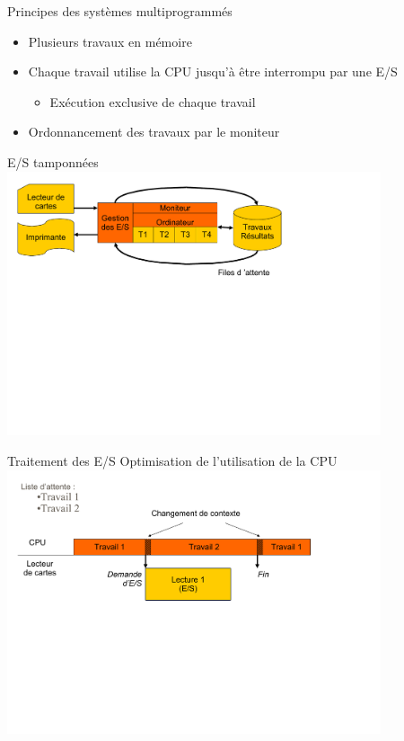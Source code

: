 \begin{frame}{Principes des systèmes multiprogrammés}
\begin{itemize}
\item Plusieurs travaux en mémoire
\item Chaque travail utilise la CPU jusqu’à être interrompu par une E/S
\begin{itemize}
\item Exécution exclusive de chaque travail
\end{itemize}
\item Ordonnancement des travaux par le moniteur
\end{itemize}
\end{frame}

\begin{frame}{E/S tamponnées}
\includegraphics[width=11cm]{../illustration/systeme_multiprogramme.pdf}
\end{frame}

\begin{frame}{Traitement des E/S}
Optimisation de l'utilisation de la CPU
\includegraphics[width=11cm]{../illustration/systeme_multiprogramme_enchainement.pdf}
\end{frame}

